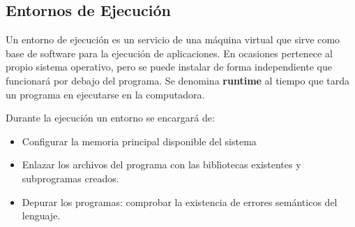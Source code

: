 \subsection{Entornos de Ejecución}
Un entorno de ejecución es un servicio de una máquina virtual que sirve como base de software para la ejecución de aplicaciones. En ocasiones pertenece al propio sistema operativo, pero se puede instalar de forma independiente que funcionará por debajo del programa. Se denomina \textbf{runtime} al tiempo que tarda un programa en ejecutarse en la computadora.

Durante la ejecución un entorno se encargará de:

\begin{itemize}
    \item Configurar la memoria principal disponible del sistema
    \item Enlazar los archivos del programa con las bibliotecas existentes y subprogramas creados.
    \item Depurar los programas: comprobar la existencia de errores semánticos del lenguaje.
\end{itemize}





\glsaddall
\printglossaries


\newpage
{}



